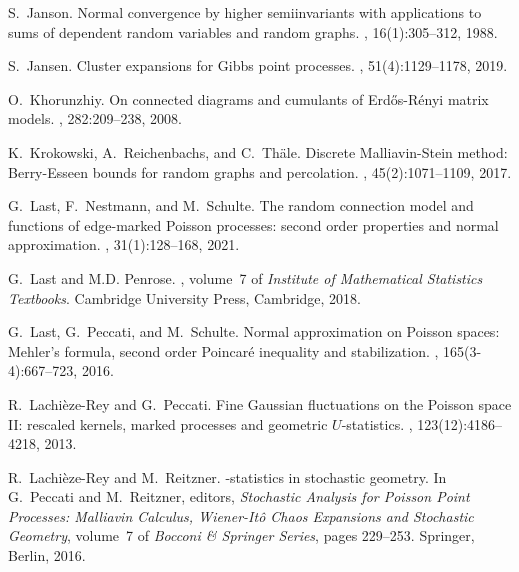 \documentclass[12pt]{article}
\let\Horig\H
\numberwithin{equation}{section}
\begin{document}
\begin{thebibliography}{BRSW17}
S.~Janson.
\newblock Normal convergence by higher semiinvariants with applications to sums
  of dependent random variables and random graphs.
, 16(1):305--312, 1988.

S.~Jansen.
\newblock Cluster expansions for {G}ibbs point processes.
, 51(4):1129--1178, 2019.

O.~Khorunzhiy.
\newblock On connected diagrams and cumulants of {E}rd{\Horig{o}}s-{R}\'enyi
  matrix models.
, 282:209--238, 2008.

K.~Krokowski, A.~Reichenbachs, and C.~Th{\"a}le.
\newblock Discrete {M}alliavin-{S}tein method: {B}erry-{E}sseen bounds for
  random graphs and percolation.
, 45(2):1071--1109, 2017.

G.~Last, F.~Nestmann, and M.~Schulte.
\newblock The random connection model and functions of edge-marked {P}oisson
  processes: second order properties and normal approximation.
, 31(1):128--168, 2021.

G.~Last and M.D. Penrose.
, volume~7 of {\em Institute
  of Mathematical Statistics Textbooks}.
\newblock Cambridge University Press, Cambridge, 2018.

G.~Last, G.~Peccati, and M.~Schulte.
\newblock Normal approximation on {P}oisson spaces: {M}ehler's formula, second
  order {P}oincar\'e inequality and stabilization.
, 165(3-4):667--723, 2016.

R.~Lachi\`eze-Rey and G.~Peccati.
\newblock Fine {G}aussian fluctuations on the {P}oisson space {II}: rescaled
  kernels, marked processes and geometric {$U$}-statistics.
, 123(12):4186--4218, 2013.

R.~Lachi\`eze-Rey and M.~Reitzner.
-statistics in stochastic geometry.
\newblock In G.~Peccati and M.~Reitzner, editors, {\em Stochastic Analysis for
  {P}oisson Point Processes: {M}alliavin Calculus, {W}iener-{I}t{\^o} Chaos
  Expansions and Stochastic Geometry}, volume~7 of {\em Bocconi \& Springer
  Series}, pages 229--253. Springer, Berlin, 2016.


\end{thebibliography}
\end{document}
